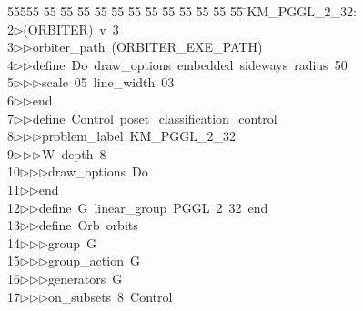 %
%
\begin{tabbing}
55555 \= 55 \= 55 \= 55 \= 55 \= 55 \= 55 \= 55 \= 55 \= 55 \= 55 \= 55 \= 55 \= \>KM\_PGGL\_2\_32:\\[0pt]
2\>$\triangleright$\>(ORBITER)\ v\ 3\ \\[0pt]
3\>$\triangleright$\>$\triangleright$\>orbiter\_path\ (ORBITER\_EXE\_PATH)\ \\[0pt]
4\>$\triangleright$\>$\triangleright$\>define\ Do\ draw\_options\ embedded\ sideways\ radius\ 50\ \\[0pt]
5\>$\triangleright$\>$\triangleright$\>$\triangleright$\>scale\ 05\ line\_width\ 03\ \\[0pt]
6\>$\triangleright$\>$\triangleright$\>end\ \\[0pt]
7\>$\triangleright$\>$\triangleright$\>define\ Control\ poset\_classification\_control\ \\[0pt]
8\>$\triangleright$\>$\triangleright$\>$\triangleright$\>problem\_label\ KM\_PGGL\_2\_32\ \\[0pt]
9\>$\triangleright$\>$\triangleright$\>$\triangleright$\>W\ depth\ 8\ \\[0pt]
10\>$\triangleright$\>$\triangleright$\>$\triangleright$\>draw\_options\ Do\ \\[0pt]
11\>$\triangleright$\>$\triangleright$\>end\ \\[0pt]
12\>$\triangleright$\>$\triangleright$\>define\ G\ linear\_group\ PGGL\ 2\ 32\ end\ \\[0pt]
13\>$\triangleright$\>$\triangleright$\>define\ Orb\ orbits\ \\[0pt]
14\>$\triangleright$\>$\triangleright$\>$\triangleright$\>group\ G\ \\[0pt]
15\>$\triangleright$\>$\triangleright$\>$\triangleright$\>group\_action\ G\ \\[0pt]
16\>$\triangleright$\>$\triangleright$\>$\triangleright$\>generators\ G\ \\[0pt]
17\>$\triangleright$\>$\triangleright$\>$\triangleright$\>on\_subsets\ 8\ Control\ \\[0pt]

\end{tabbing}
